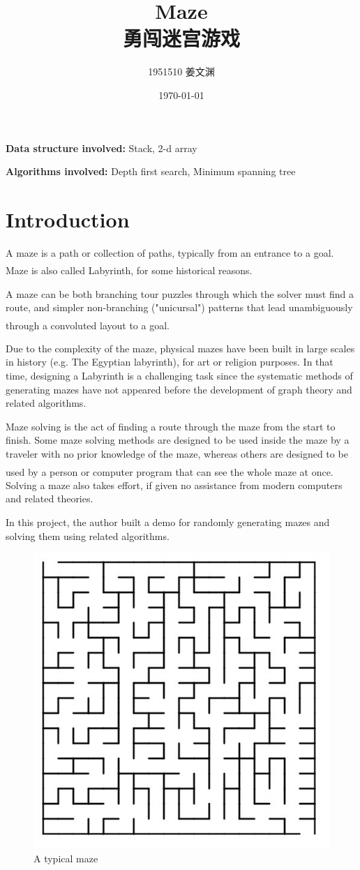 \documentclass[cn,black,12pt,normal]{elegantnote}
\title{Maze\\勇闯迷宫游戏}
\author{1951510\; 姜文渊}
\institute{\small \url{https://github.com/jwyjohn/Jwy_DataStructureHomework}}
\date{\today}
\newcommand{\uct}[1]{\textsuperscript{\textsuperscript{\cite{#1}}}}
\begin{document}
\maketitle

\textbf{Data structure involved:} Stack, 2-d array

\textbf{Algorithms involved:} Depth first search, Minimum spanning tree

\tableofcontents

\newpage

\section{Introduction}

A maze is a path or collection of paths, typically from an entrance to a goal. Maze is also called Labyrinth, for some historical reasons.\uct{wiki:Labyrinth}

A maze can be both branching tour puzzles through which the solver must find a route, and simpler non-branching ("unicursal") patterns that lead unambiguously through a convoluted layout to a goal.\uct{wiki:Maze}

Due to the complexity of the maze, physical mazes have been built in large scales in history (e.g. The Egyptian labyrinth), for art or religion purposes. In that time, designing a Labyrinth is a challenging task since the systematic methods of generating mazes have not appeared before the development of graph theory and related algorithms.

Maze solving is the act of finding a route through the maze from the start to finish. Some maze solving methods are designed to be used inside the maze by a traveler with no prior knowledge of the maze, whereas others are designed to be used by a person or computer program that can see the whole maze at once.\uct{wiki:Maze} Solving a maze also takes effort, if given no assistance from modern computers and related theories.

In this project, the author built a demo for randomly generating mazes and solving them using related algorithms.

\begin{figure}[H]
    \centering
    \includegraphics[width=0.5\linewidth]{image/tm.jpg}
    \caption{A typical maze}
\end{figure}
\end{document}
